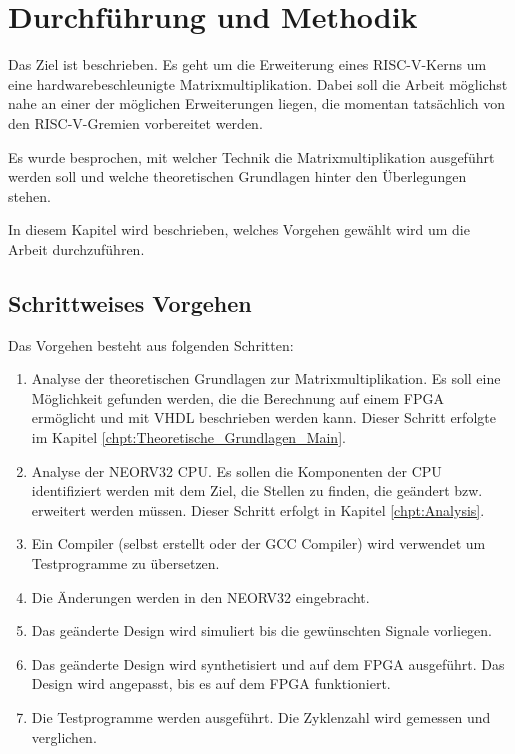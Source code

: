 \chapter{Durchführung und Methodik} \label{chpt:Methodik_Main}

Das Ziel ist beschrieben. Es geht um die Erweiterung eines RISC-V-Kerns um eine hardwarebeschleunigte Matrixmultiplikation. Dabei soll die Arbeit möglichst nahe an einer der möglichen Erweiterungen liegen, die momentan tatsächlich von den RISC-V-Gremien vorbereitet werden.

Es wurde besprochen, mit welcher Technik die Matrixmultiplikation ausgeführt werden soll und welche theoretischen Grundlagen hinter den Überlegungen stehen.

In diesem Kapitel wird beschrieben, welches Vorgehen gewählt wird um die Arbeit durchzuführen.




\section{Schrittweises Vorgehen} \label{sec:steps}

Das Vorgehen besteht aus folgenden Schritten:

\begin{enumerate}

    \item Analyse der theoretischen Grundlagen zur Matrixmultiplikation. Es soll eine Möglichkeit gefunden werden, die die Berechnung auf einem FPGA ermöglicht und mit VHDL beschrieben werden kann. Dieser Schritt erfolgte im Kapitel \ref{chpt:Theoretische_Grundlagen_Main}.

    \item Analyse der NEORV32 CPU. Es sollen die Komponenten der CPU identifiziert werden mit dem Ziel, die Stellen zu finden, die geändert bzw. erweitert werden müssen. Dieser Schritt erfolgt in Kapitel \ref{chpt:Analysis}.

    \item Ein Compiler (selbst erstellt oder der GCC Compiler) wird verwendet um Testprogramme zu übersetzen.

    \item Die Änderungen werden in den NEORV32 eingebracht.

    \item Das geänderte Design wird simuliert bis die gewünschten Signale vorliegen.

    \item Das geänderte Design wird synthetisiert und auf dem FPGA ausgeführt. Das Design wird angepasst, bis es auf dem FPGA funktioniert.

    \item Die Testprogramme werden ausgeführt. Die Zyklenzahl wird gemessen und verglichen.

\end{enumerate}

